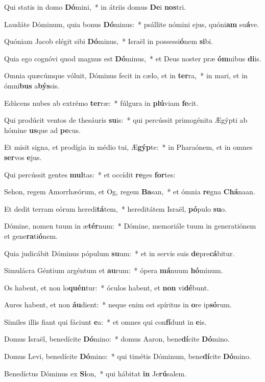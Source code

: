 \item Qui statis in domo \textbf{Dó}mini,~* in átriis domus \textbf{De}i \textbf{nos}tri.
\item Laudáte Dóminum, quia bonus \textbf{Dó}minus:~* psállite nómini ejus, quóni\textbf{am} su\textbf{á}ve.
\item Quóniam Jacob elégit sibi \textbf{Dó}minus,~* Israël in possessi\textbf{ó}nem \textbf{si}bi.
\item Quia ego cognóvi quod magnus est \textbf{Dó}minus,~* et Deus noster præ \textbf{óm}nibus \textbf{di}is.
\item Omnia quæcúmque vóluit, Dóminus fecit in cælo, et in \textbf{ter}ra,~* in mari, et in ómni\textbf{bus} a\textbf{býs}sis.
\item Edúcens nubes ab extrémo \textbf{ter}ræ:~* fúlgura in \textbf{plú}viam \textbf{fe}cit.
\item Qui prodúcit ventos de thesáuris \textbf{su}is:~* qui percússit primogénita Ægýpti ab hómine \textbf{us}que ad \textbf{pe}cus.
\item Et misit signa, et prodígia in médio tui, Æ\textbf{gýp}te:~* in Pharaónem, et in omnes \textbf{ser}vos \textbf{e}jus.
\item Qui percússit gentes \textbf{mul}tas:~* et occídit \textbf{re}ges \textbf{for}tes:
\item Sehon, regem Amorrhæórum, et Og, regem \textbf{Ba}san,~* et ómnia \textbf{re}gna \textbf{Chá}naan.
\item Et dedit terram eórum heredi\textbf{tá}tem,~* hereditátem Israël, \textbf{pó}pulo \textbf{su}o.
\item Dómine, nomen tuum in æ\textbf{tér}num:~* Dómine, memoriále tuum in generatiónem et gene\textbf{ra}ti\textbf{ó}nem.
\item Quia judicábit Dóminus pópulum \textbf{su}um:~* et in servis suis \textbf{de}pre\textbf{cá}bitur.
\item Simulácra Géntium argéntum et \textbf{au}rum:~* ópera \textbf{má}nuum \textbf{hó}minum.
\item Os habent, et non lo\textbf{quén}tur:~* óculos habent, et \textbf{non} vi\textbf{dé}bunt.
\item Aures habent, et non \textbf{áu}dient:~* neque enim est spíritus in \textbf{o}re ip\textbf{só}rum.
\item Símiles illis fiant qui fáciunt \textbf{e}a:~* et omnes qui con\textbf{fí}dunt in \textbf{e}is.
\item Domus Israël, benedícite \textbf{Dó}mino:~* domus Aaron, bene\textbf{dí}cite \textbf{Dó}mino.
\item Domus Levi, benedícite \textbf{Dó}mino:~* qui timétis Dóminum, bene\textbf{dí}cite \textbf{Dó}mino.
\item Benedíctus Dóminus ex \textbf{Si}on,~* qui hábitat \textbf{in} Je\textbf{rú}salem.
